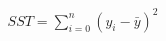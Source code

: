 \documentclass[10pt]{article}
\begin{document}
\begin{align*}SST = {\sum\limits_{i=0}^n} (y_i - \bar{y})^2\end{align*}
\end{document}
